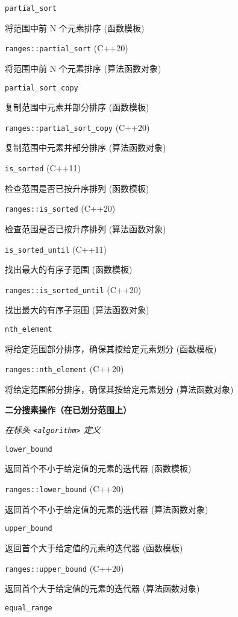 \noindent \lstinline{partial_sort}

将范围中前 N 个元素排序 (函数模板)

\noindent \lstinline{ranges::partial_sort} (C++20)

将范围中前 N 个元素排序 (算法函数对象)

\noindent \lstinline{partial_sort_copy}

复制范围中元素并部分排序 (函数模板)

\noindent \lstinline{ranges::partial_sort_copy} (C++20)

复制范围中元素并部分排序 (算法函数对象)

\noindent \lstinline{is_sorted} (C++11)

检查范围是否已按升序排列 (函数模板)

\noindent \lstinline{ranges::is_sorted} (C++20)

检查范围是否已按升序排列 (算法函数对象)

\noindent \lstinline{is_sorted_until} (C++11)

找出最⼤的有序⼦范围 (函数模板)

\noindent \lstinline{ranges::is_sorted_until} (C++20)

找出最⼤的有序⼦范围 (算法函数对象)

\noindent \lstinline{nth_element}

将给定范围部分排序，确保其按给定元素划分 (函数模板)

\noindent \lstinline{ranges::nth_element} (C++20)

将给定范围部分排序，确保其按给定元素划分 (算法函数对象)

\noindent \textbf{二分搜素操作（在已划分范围上）}

\textit{在标头 \lstinline{<algorithm>} 定义}


\noindent \lstinline{lower_bound}

返回⾸个不⼩于给定值的元素的迭代器 (函数模板)

\noindent \lstinline{ranges::lower_bound} (C++20)

返回⾸个不⼩于给定值的元素的迭代器 (算法函数对象)

\noindent \lstinline{upper_bound}

返回⾸个⼤于给定值的元素的迭代器 (函数模板)

\noindent \lstinline{ranges::upper_bound} (C++20)

返回⾸个⼤于给定值的元素的迭代器 (算法函数对象)

\noindent \lstinline{equal_range}

